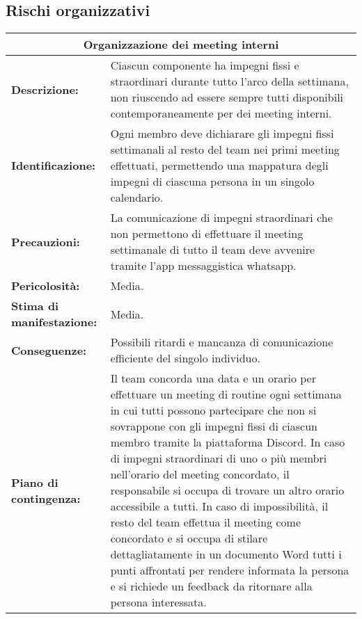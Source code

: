 \subsection{Rischi organizzativi}

\begin{tabular}{ |p{4cm}|p{10cm}|}
\hline
\multicolumn{2}{|c|}{\textbf{Organizzazione dei meeting interni}} \\
\hline
\textbf{Descrizione:}& Ciascun componente ha impegni fissi e straordinari durante tutto l'arco della settimana, non riuscendo ad essere sempre tutti disponibili contemporaneamente per dei meeting interni.\\
\hline
\textbf{Identificazione:}& Ogni membro deve dichiarare gli impegni fissi settimanali al resto del team nei primi meeting effettuati, permettendo una mappatura degli impegni di ciascuna persona in un singolo calendario.\\
\hline
\textbf{Precauzioni:}& La comunicazione di impegni straordinari che non permettono di effettuare il meeting settimanale di tutto il team deve avvenire tramite l'app messaggistica whatsapp.\\
\hline
\textbf{Pericolosità:}& Media.\\
\hline
\textbf{Stima di manifestazione:}& Media.\\
\hline
\textbf{Conseguenze:}& Possibili ritardi e mancanza di comunicazione efficiente del singolo individuo.\\
\hline
\textbf{Piano di contingenza:}& Il team concorda una data e un orario per effettuare un meeting di routine ogni settimana in cui tutti possono partecipare che non si sovrappone con gli impegni fissi di ciascun membro tramite la piattaforma Discord. In caso di impegni straordinari di uno o più membri nell'orario del meeting concordato, il responsabile si occupa di trovare un altro orario accessibile a tutti. In caso di impossibilità, il resto del team effettua il meeting come concordato e si occupa di stilare dettagliatamente in un documento Word tutti i punti affrontati per rendere informata la persona e si richiede un feedback da ritornare alla persona interessata.\\
\hline
\end{tabular}

\vspace{20pt}

